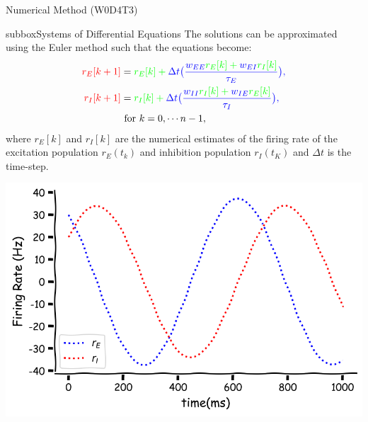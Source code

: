 \begin{textbox}{Numerical Method (W0D4T3)}
\begin{subbox}{subbox}{Systems of Differential Equations}
The solutions can be approximated using the Euler method such that the equations become:
\begin{align*}
\color{red}{r_E[k+1]}&=\color{green}{r_E[k]}+\color{blue}{\Delta t}\big(\frac{\color{blue}{w_{EE}}\color{green}{r_E[k]}+\color{blue}{w_{EI}}\color{green}{r_I[k]}}{\color{blue}{\tau_E}}\big),\\
\color{red}{r_I[k+1]}&=\color{green}{r_I[k]}+\color{blue}{\Delta t}\big(\frac{\color{blue}{w_{II}}\color{green}{r_I[k]}+\color{blue}{w_{IE}}\color{green}{r_E[k]}}{\color{blue}{\tau_I}}\big),\\
&\text{ for } k=0, \cdots n-1,
\end{align*}
where $r_E[k]$ and $r_I[k]$ are the numerical estimates of the firing rate of the excitation population $r_E(t_k)$ and inhibition population $r_I(t_K)$ and $\Delta t$ is the time-step.

\centering
\includegraphics[scale=0.1]{Figures/PreCourse/CFigure9.png}
\end{subbox}
\end{textbox}

